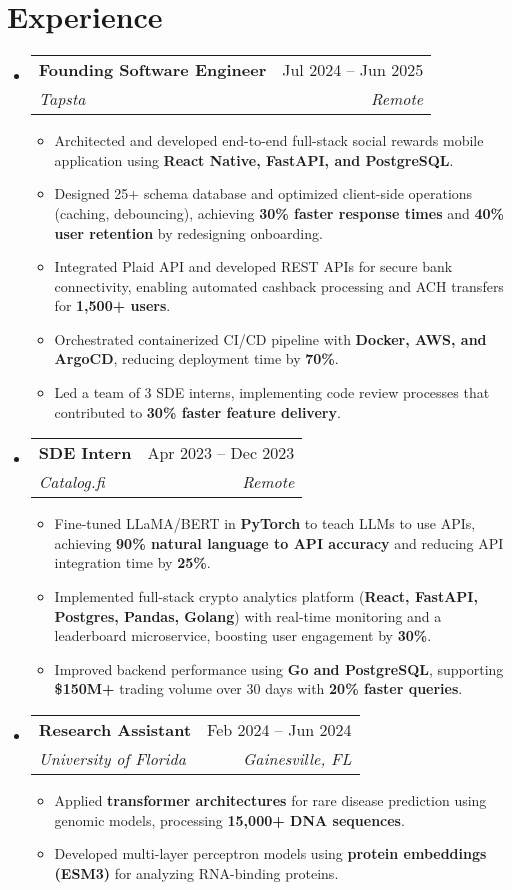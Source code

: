 \documentclass[a4paper,11pt]{article}
\makeatletter
\newcommand{\resumeItem}[1]{
  \item\small{#1}
}
\newcommand{\resumeItemListStart}{\begin{itemize}[rightmargin=0.11in]}
\newcommand{\resumeItemListEnd}{\end{itemize}}
\newcommand{\resumeQuadHeading}[4]{
  \item
  \begin{tabular*}{0.96\textwidth}[t]{l@{\extracolsep{\fill}}r}
    \textbf{#1} & #2 \\
    \textit{\small#3} & \textit{\small #4} \\
  \end{tabular*}
}
\newcommand{\resumeHeadingListStart}{
  \begin{itemize}[leftmargin=0.15in, label={}]
}
\newcommand{\resumeHeadingListEnd}{\end{itemize}}
\makeatother
\begin{document}

\section{Experience}
\resumeHeadingListStart{}
  \resumeQuadHeading{Founding Software Engineer}{Jul 2024 -- Jun 2025}
  {Tapsta}{Remote}
    \resumeItemListStart{}
      \resumeItem{Architected and developed end-to-end full-stack social rewards mobile application using \textbf{React Native, FastAPI, and PostgreSQL}.}
      \resumeItem{Designed 25+ schema database and optimized client-side operations (caching, debouncing), achieving \textbf{30\% faster response times} and \textbf{40\% user retention} by redesigning onboarding.}
      \resumeItem{Integrated Plaid API and developed REST APIs for secure bank connectivity, enabling automated cashback processing and ACH transfers for \textbf{1,500+ users}.}
      \resumeItem{Orchestrated containerized CI/CD pipeline with \textbf{Docker, AWS, and ArgoCD}, reducing deployment time by \textbf{70\%}.}
      \resumeItem{Led a team of 3 SDE interns, implementing code review processes that contributed to \textbf{30\% faster feature delivery}.}
    \resumeItemListEnd{}

  \resumeQuadHeading{SDE Intern}{Apr 2023 -- Dec 2023}
  {Catalog.fi}{Remote}
    \resumeItemListStart{}
      \resumeItem{Fine-tuned LLaMA/BERT in \textbf{PyTorch} to teach LLMs to use APIs, achieving \textbf{90\% natural language to API accuracy} and reducing API integration time by \textbf{25\%}.}
      \resumeItem{Implemented full-stack crypto analytics platform (\textbf{React, FastAPI, Postgres, Pandas, Golang}) with real-time monitoring and a leaderboard microservice, boosting user engagement by \textbf{30\%}.}
      \resumeItem{Improved backend performance using \textbf{Go and PostgreSQL}, supporting \textbf{\$150M+} trading volume over 30 days with \textbf{20\% faster queries}.}
    \resumeItemListEnd{}

  \resumeQuadHeading{Research Assistant}{Feb 2024 -- Jun 2024}
  {University of Florida}{Gainesville, FL}
    \resumeItemListStart{}
      \resumeItem{Applied \textbf{transformer architectures} for rare disease prediction using genomic models, processing \textbf{15,000+ DNA sequences}.}
      \resumeItem{Developed multi-layer perceptron models using \textbf{protein embeddings (ESM3)} for analyzing RNA-binding proteins.}
    \resumeItemListEnd{}
\resumeHeadingListEnd{}
\end{document}
